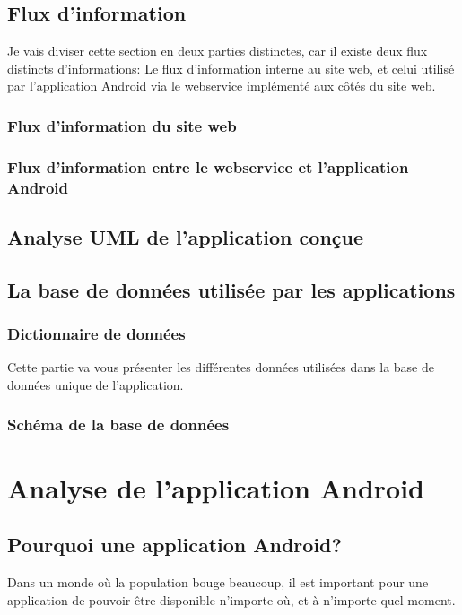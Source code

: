 \documentclass[12pt,table,a4paper]{report}
\begin{document}
\subsection{Flux d'information}
Je vais diviser cette section en deux parties distinctes, car il existe deux flux distincts d'informations: Le flux d'information interne au site web, et celui utilisé par l'application Android via le webservice implémenté aux côtés du site web.

\subsubsection{Flux d'information du site web}

\subsubsection{Flux d'information entre le webservice et l'application Android}

\subsection{Analyse UML de l'application conçue}

\subsection{La base de données utilisée par les applications}

\subsubsection{Dictionnaire de données}
Cette partie va vous présenter les différentes données utilisées dans la base de données unique de l'application.

\subsubsection{Schéma de la base de données}

\section{Analyse de l'application Android}

\subsection{Pourquoi une application Android?}
Dans un monde où la population bouge beaucoup, il est important pour une application de pouvoir être disponible n'importe où, et à n'importe quel moment.
\end{document}

